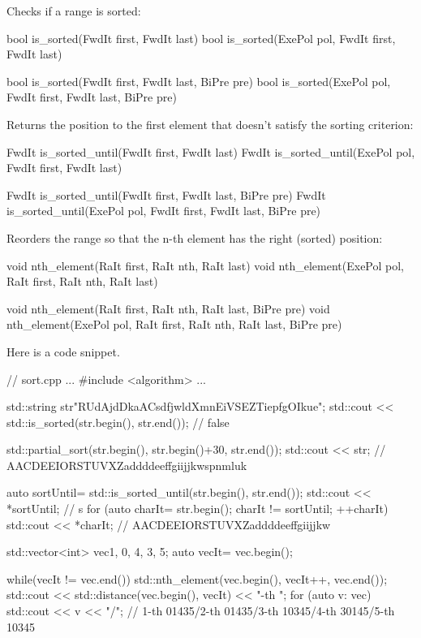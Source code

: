 Checks if a range is sorted:

\begin{cpp}
bool is_sorted(FwdIt first, FwdIt last)
bool is_sorted(ExePol pol, FwdIt first, FwdIt last)

bool is_sorted(FwdIt first, FwdIt last, BiPre pre)
bool is_sorted(ExePol pol, FwdIt first, FwdIt last, BiPre pre)
\end{cpp}

Returns the position to the first element that doesn’t satisfy the sorting criterion:

\begin{cpp}
FwdIt is_sorted_until(FwdIt first, FwdIt last)
FwdIt is_sorted_until(ExePol pol, FwdIt first, FwdIt last)

FwdIt is_sorted_until(FwdIt first, FwdIt last, BiPre pre)
FwdIt is_sorted_until(ExePol pol, FwdIt first, FwdIt last, BiPre pre)
\end{cpp}

Reorders the range so that the n-th element has the right (sorted) position:

\begin{cpp}
void nth_element(RaIt first, RaIt nth, RaIt last)
void nth_element(ExePol pol, RaIt first, RaIt nth, RaIt last)

void nth_element(RaIt first, RaIt nth, RaIt last, BiPre pre)
void nth_element(ExePol pol, RaIt first, RaIt nth, RaIt last, BiPre pre)
\end{cpp}

Here is a code snippet.


\begin{cpp}
// sort.cpp
...
#include <algorithm>
...

std::string str{"RUdAjdDkaACsdfjwldXmnEiVSEZTiepfgOIkue"};
std::cout << std::is_sorted(str.begin(), str.end()); // false

std::partial_sort(str.begin(), str.begin()+30, str.end());
std::cout << str; // AACDEEIORSTUVXZaddddeeffgiijjkwspnmluk

auto sortUntil= std::is_sorted_until(str.begin(), str.end());
std::cout << *sortUntil; // s
for (auto charIt= str.begin(); charIt != sortUntil; ++charIt)
	std::cout << *charIt; // AACDEEIORSTUVXZaddddeeffgiijjkw

std::vector<int> vec{1, 0, 4, 3, 5};
auto vecIt= vec.begin();

while(vecIt != vec.end()){
	std::nth_element(vec.begin(), vecIt++, vec.end());
	std::cout << std::distance(vec.begin(), vecIt) << "-th ";
	for (auto v: vec) std::cout << v << "/";
}
// 1-th 01435/2-th 01435/3-th 10345/4-th 30145/5-th 10345
\end{cpp}












